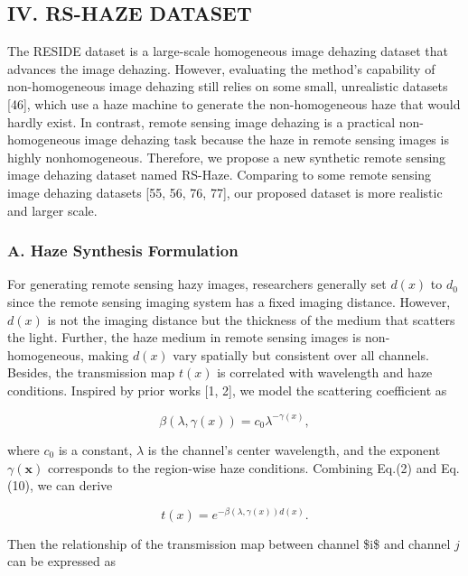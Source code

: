 \subsection{IV. RS-HAZE DATASET}

The RESIDE dataset is a large-scale homogeneous image dehazing dataset that advances the image dehazing. However, evaluating the method’s capability of non-homogeneous image dehazing still relies on some small, unrealistic datasets [46], which use a haze machine to generate the non-homogeneous haze that would hardly exist. In contrast, remote sensing image dehazing is a practical non-homogeneous image dehazing task because the haze in remote sensing images is highly nonhomogeneous. Therefore, we propose a new synthetic remote sensing image dehazing dataset named RS-Haze. Comparing to some remote sensing image dehazing datasets [55, 56, 76, 77], our proposed dataset is more realistic and larger scale.

\subsubsection{A. Haze Synthesis Formulation}

For generating remote sensing hazy images, researchers generally set $d(x)$ to $d_{0}$ since the remote sensing imaging system has a fixed imaging distance. However, $d(x)$ is not the imaging distance but the thickness of the medium that scatters the light. Further, the haze medium in remote sensing images is non-homogeneous, making $d(x)$ vary spatially but consistent over all channels. Besides, the transmission map $t(x)$ is correlated with wavelength and haze conditions. Inspired by prior works [1, 2], we model the scattering coefficient as

\begin{equation}
\beta(\lambda,\gamma(x))=c_{0}\lambda^{-\gamma(x)},
\end{equation}

where $c_{0}$ is a constant, $\lambda$ is the channel’s center wavelength, and the exponent $\gamma(\boldsymbol{x})$ corresponds to the region-wise haze conditions. Combining Eq.(2) and Eq.(10), we can derive

\begin{equation}
t(x)=e^{-\beta(\lambda,\gamma(x))d(x)}.
\end{equation}

Then the relationship of the transmission map between channel \$i\$ and channel $j$ can be expressed as

